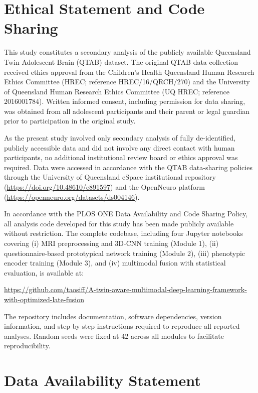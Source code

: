 \documentclass[10pt,letterpaper]{article}
\begin{document}
\section*{Ethical Statement and Code Sharing}

This study constitutes a secondary analysis of the publicly available Queensland Twin Adolescent Brain (QTAB) dataset. The original QTAB data collection received ethics approval from the Children's Health Queensland Human Research Ethics Committee (HREC; reference HREC/16/QRCH/270) and the University of Queensland Human Research Ethics Committee (UQ HREC; reference 2016001784). Written informed consent, including permission for data sharing, was obtained from all adolescent participants and their parent or legal guardian prior to participation in the original study.

As the present study involved only secondary analysis of fully de-identified, publicly accessible data and did not involve any direct contact with human participants, no additional institutional review board or ethics approval was required. Data were accessed in accordance with the QTAB data-sharing policies through the University of Queensland eSpace institutional repository (\url{https://doi.org/10.48610/e891597}) and the OpenNeuro platform (\url{https://openneuro.org/datasets/ds004146}).

In accordance with the PLOS ONE Data Availability and Code Sharing Policy, all analysis code developed for this study has been made publicly available without restriction. The complete codebase, including four Jupyter notebooks covering (i) MRI preprocessing and 3D-CNN training (Module 1), (ii) questionnaire-based prototypical network training (Module 2), (iii) phenotypic encoder training (Module 3), and (iv) multimodal fusion with statistical evaluation, is available at:

\begin{center}
\url{https://github.com/taosiff/A-twin-aware-multimodal-deep-learning-framework-with-optimized-late-fusion}
\end{center}

The repository includes documentation, software dependencies, version information, and step-by-step instructions required to reproduce all reported analyses. Random seeds were fixed at 42 across all modules to facilitate reproducibility.

\section*{Data Availability Statement}
\end{document}
